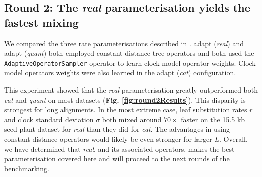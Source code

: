 \documentclass[10pt,letterpaper]{article}
\begin{document}
\clearpage
\subsection*{Round 2: The \textit{real} parameterisation yields the fastest mixing }

We compared the three rate parameterisations described in \textbf{}. 
adapt (\textit{real}) and adapt (\textit{quant}) both employed constant distance tree operators \cite{zhang2020improving} and both used the \texttt{AdaptiveOperatorSampler} operator to learn clock model operator weights.
Clock model operators weights were also learned in the adapt (\textit{cat}) configuration.




This experiment showed that the \textit{real} parameterisation greatly outperformed both \textit{cat} and \textit{quant} on most datasets (\textbf{Fig. \ref{fig:round2Results}}).
This disparity is strongest for long alignments.
In the most extreme case, leaf substitution rates $r$ and clock standard deviation $\sigma$ both mixed around $70 \times$ faster on the 15.5 kb seed plant dataset \cite{Ran_2018} for \textit{real} than they did for \textit{cat}.
The advantages in using constant distance operators would likely be even stronger for larger $L$.
Overall, we have determined that \textit{real}, and its associated operators, makes the best parameterisation covered here and will proceed to the next rounds of the benchmarking.
\end{document}
